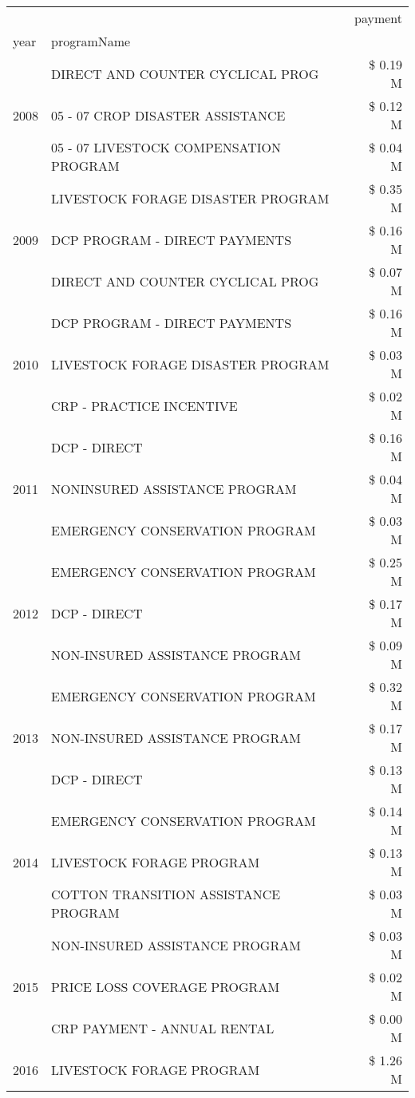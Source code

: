 \begin{tabular}{llr}
\toprule
 &  & payment \\
year & programName &  \\
\midrule
\multirow[t]{3}{*}{2008} & DIRECT AND COUNTER CYCLICAL PROG & \$ 0.19 M \\
 & 05 - 07 CROP DISASTER ASSISTANCE & \$ 0.12 M \\
 & 05 - 07 LIVESTOCK COMPENSATION PROGRAM & \$ 0.04 M \\
\cline{1-3}
\multirow[t]{3}{*}{2009} & LIVESTOCK FORAGE DISASTER  PROGRAM & \$ 0.35 M \\
 & DCP PROGRAM - DIRECT PAYMENTS & \$ 0.16 M \\
 & DIRECT AND COUNTER CYCLICAL PROG & \$ 0.07 M \\
\cline{1-3}
\multirow[t]{3}{*}{2010} & DCP PROGRAM - DIRECT PAYMENTS & \$ 0.16 M \\
 & LIVESTOCK FORAGE DISASTER  PROGRAM & \$ 0.03 M \\
 & CRP - PRACTICE INCENTIVE & \$ 0.02 M \\
\cline{1-3}
\multirow[t]{3}{*}{2011} & DCP - DIRECT & \$ 0.16 M \\
 & NONINSURED ASSISTANCE PROGRAM & \$ 0.04 M \\
 & EMERGENCY CONSERVATION PROGRAM & \$ 0.03 M \\
\cline{1-3}
\multirow[t]{3}{*}{2012} & EMERGENCY CONSERVATION PROGRAM & \$ 0.25 M \\
 & DCP - DIRECT & \$ 0.17 M \\
 & NON-INSURED ASSISTANCE PROGRAM & \$ 0.09 M \\
\cline{1-3}
\multirow[t]{3}{*}{2013} & EMERGENCY CONSERVATION PROGRAM & \$ 0.32 M \\
 & NON-INSURED ASSISTANCE PROGRAM & \$ 0.17 M \\
 & DCP - DIRECT & \$ 0.13 M \\
\cline{1-3}
\multirow[t]{3}{*}{2014} & EMERGENCY CONSERVATION PROGRAM & \$ 0.14 M \\
 & LIVESTOCK FORAGE PROGRAM & \$ 0.13 M \\
 & COTTON TRANSITION ASSISTANCE PROGRAM & \$ 0.03 M \\
\cline{1-3}
\multirow[t]{3}{*}{2015} & NON-INSURED ASSISTANCE PROGRAM & \$ 0.03 M \\
 & PRICE LOSS COVERAGE PROGRAM & \$ 0.02 M \\
 & CRP PAYMENT - ANNUAL RENTAL & \$ 0.00 M \\
\cline{1-3}
\multirow[t]{3}{*}{2016} & LIVESTOCK FORAGE PROGRAM                      & \$ 1.26 M \\

\end{tabular}
